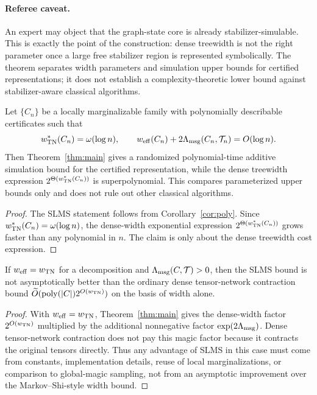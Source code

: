\paragraph{Referee caveat.}
An expert may object that the graph-state core is already stabilizer-simulable. This is exactly the point of the construction: dense treewidth is not the right parameter once a large free stabilizer region is represented symbolically. The theorem separates width parameters and simulation upper bounds for certified representations; it does not establish a complexity-theoretic lower bound against stabilizer-aware classical algorithms.

\begin{corollary}
\label{cor:dense-width-bound-separation}
Let \(\{C_n\}\) be a locally marginalizable family with polynomially describable certificates such that
\[
w_{\mathrm{TN}}^\ast(C_n)=\omega(\log n),
\qquad
w_{\mathrm{eff}}(C_n)+2\Lambda_{\mathrm{msg}}(C_n,\mathcal{T}_n)=O(\log n).
\]
Then Theorem~\ref{thm:main} gives a randomized polynomial-time additive simulation bound for the certified representation, while the dense treewidth expression \(2^{\Theta(w_{\mathrm{TN}}^\ast(C_n))}\) is superpolynomial. This compares parameterized upper bounds only and does not rule out other classical algorithms.
\end{corollary}

\begin{proof}
The SLMS statement follows from Corollary~\ref{cor:poly}. Since \(w_{\mathrm{TN}}^\ast(C_n)=\omega(\log n)\), the dense-width exponential expression \(2^{\Theta(w_{\mathrm{TN}}^\ast(C_n))}\) grows faster than any polynomial in \(n\). The claim is only about the dense treewidth cost expression.
\end{proof}

\begin{proposition}
\label{prop:non-improvement}
If \(w_{\mathrm{eff}}=w_{\mathrm{TN}}\) for a decomposition and \(\Lambda_{\mathrm{msg}}(C,\mathcal{T})>0\), then the SLMS bound is not asymptotically better than the ordinary dense tensor-network contraction bound \( \widetilde{O}(\operatorname{poly}(|C|)2^{O(w_{\mathrm{TN}})}) \) on the basis of width alone.
\end{proposition}

\begin{proof}
With \(w_{\mathrm{eff}}=w_{\mathrm{TN}}\), Theorem~\ref{thm:main} gives the dense-width factor \(2^{O(w_{\mathrm{TN}})}\) multiplied by the additional nonnegative factor \(\exp(2\Lambda_{\mathrm{msg}})\). Dense tensor-network contraction does not pay this magic factor because it contracts the original tensors directly. Thus any advantage of SLMS in this case must come from constants, implementation details, reuse of local marginalizations, or comparison to global-magic sampling, not from an asymptotic improvement over the Markov--Shi-style width bound.
\end{proof}

